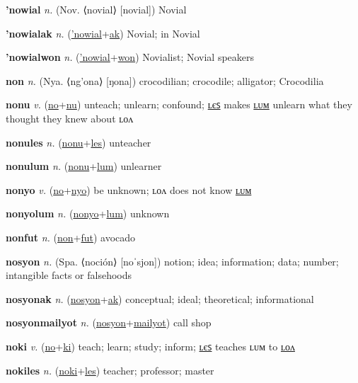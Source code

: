 \textbf{\hypertarget{'nowial}{'nowial}} \textit{n.} (Nov. ⟨novial⟩ [novial])
Novial

\textbf{\hypertarget{'nowialak}{'nowialak}} \textit{n.} (\hyperlink{'nowial}{'nowial}+\allowbreak \hyperlink{ak}{ak})
Novial; in Novial

\textbf{\hypertarget{'nowialwon}{'nowialwon}} \textit{n.} (\hyperlink{'nowial}{'nowial}+\allowbreak \hyperlink{won}{won})
Novialist; Novial speakers

\textbf{\hypertarget{non}{non}} \textit{n.} (Nya. ⟨ng’ona⟩ [ŋona])
crocodilian; crocodile; alligator; Crocodilia

\textbf{\hypertarget{nonu}{nonu}} \textit{v.} (\hyperlink{no}{no}+\allowbreak \hyperlink{nu}{nu})
unteach; unlearn; confound; \hyperlink{nonules}{ʟєꜱ} makes \hyperlink{nonulum}{ʟᴜᴍ} unlearn what they thought they knew about ʟᴏᴧ

\textbf{\hypertarget{nonules}{nonules}} \textit{n.} (\hyperlink{nonu}{nonu}+\allowbreak \hyperlink{les}{les})
unteacher

\textbf{\hypertarget{nonulum}{nonulum}} \textit{n.} (\hyperlink{nonu}{nonu}+\allowbreak \hyperlink{lum}{lum})
unlearner

\textbf{\hypertarget{nonyo}{nonyo}} \textit{v.} (\hyperlink{no}{no}+\allowbreak \hyperlink{nyo}{nyo})
be unknown; ʟᴏᴧ does not know \hyperlink{nonyolum}{ʟᴜᴍ}

\textbf{\hypertarget{nonyolum}{nonyolum}} \textit{n.} (\hyperlink{nonyo}{nonyo}+\allowbreak \hyperlink{lum}{lum})
unknown

\textbf{\hypertarget{nonfut}{nonfut}} \textit{n.} (\hyperlink{non}{non}+\allowbreak \hyperlink{fut}{fut})
avocado

\textbf{\hypertarget{nosyon}{nosyon}} \textit{n.} (Spa. ⟨noción⟩ [noˈsjon])
notion; idea; information; data; number; intangible facts or falsehoods

\textbf{\hypertarget{nosyonak}{nosyonak}} \textit{n.} (\hyperlink{nosyon}{nosyon}+\allowbreak \hyperlink{ak}{ak})
conceptual; ideal; theoretical; informational

\textbf{\hypertarget{nosyonmailyot}{nosyonmailyot}} \textit{n.} (\hyperlink{nosyon}{nosyon}+\allowbreak \hyperlink{mailyot}{mailyot})
call shop

\textbf{\hypertarget{noki}{noki}} \textit{v.} (\hyperlink{no}{no}+\allowbreak \hyperlink{ki}{ki})
teach; learn; study; inform; \hyperlink{nokiles}{ʟєꜱ} teaches ʟᴜᴍ to \hyperlink{nokilon}{ʟᴏᴧ}

\textbf{\hypertarget{nokiles}{nokiles}} \textit{n.} (\hyperlink{noki}{noki}+\allowbreak \hyperlink{les}{les})
teacher; professor; master

